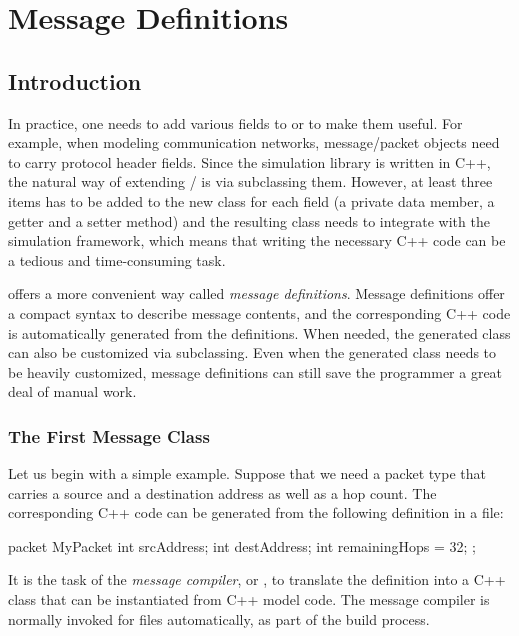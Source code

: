 \chapter{Message Definitions}
\label{cha:msg-def}


\section{Introduction}
\label{sec:msg-defs:intro}

In practice, one needs to add various fields to  or
 to make them useful. For example, when modeling
communication networks, message/packet objects need to carry protocol
header fields. Since the simulation library is written in C++, the natural
way of extending / is via subclassing
them. However, at least three items has to be added to the new class for
each field (a private data member, a getter and a setter method) and the
resulting class needs to integrate with the simulation framework, which
means that writing the necessary C++ code can be a tedious and
time-consuming task.

{\opp} offers a more convenient way called \textit{message definitions}.
Message definitions offer a compact syntax to describe message contents,
and the corresponding C++ code is automatically generated from the
definitions. When needed, the generated class can also be customized via
subclassing. Even when the generated class needs to be heavily customized,
message definitions can still save the programmer a great deal of manual
work.


\subsection{The First Message Class}
\label{sec:msg-defs:first-msg-class}

Let us begin with a simple example. Suppose that we need a packet type that
carries a source and a destination address as well as a hop count. The
corresponding C++ code can be generated from the following definition in a
 file:

\begin{msg}
packet MyPacket
{
     int srcAddress;
     int destAddress;
     int remainingHops = 32;
};
\end{msg}

It is the task of the {\opp} \textit{message compiler},  or
, to translate the definition into a C++ class that can be
instantiated from C++ model code. The message compiler is normally invoked for
 files automatically, as part of the build process.

